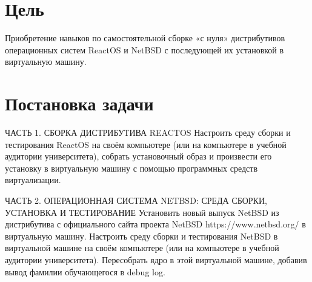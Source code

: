 \documentclass[a4paper, 14pt]{extarticle}
\begin{document}
\section{Цель}
\begin{flushleft}
Приобретение навыков по самостоятельной сборке «с нуля»
дистрибутивов операционных систем ReactOS и NetBSD с последующей их
установкой в виртуальную машину.

\end{flushleft}
\pagebreak

\section{Постановка задачи}
\begin{flushleft}
ЧАСТЬ 1. СБОРКА ДИСТРИБУТИВА REACTOS \newline
Настроить среду сборки и тестирования ReactOS на своём компьютере
(или на компьютере в учебной аудитории университета), собрать установочный
образ и произвести его установку в виртуальную машину с помощью
программных средств виртуализации. \newline

ЧАСТЬ 2. ОПЕРАЦИОННАЯ СИСТЕМА NETBSD: СРЕДА СБОРКИ,
УСТАНОВКА И ТЕСТИРОВАНИЕ \newline
Установить новый выпуск NetBSD из дистрибутива с официального сайта
проекта NetBSD https://www.netbsd.org/
в виртуальную машину. Настроить среду сборки и тестирования NetBSD в виртуальной машине на своём компьютере (или на компьютере в учебной аудитории университета). Пересобрать ядро в этой виртуальной машине, добавив вывод фамилии
обучающегося в debug log.

\end{flushleft}
\pagebreak
\end{document}
